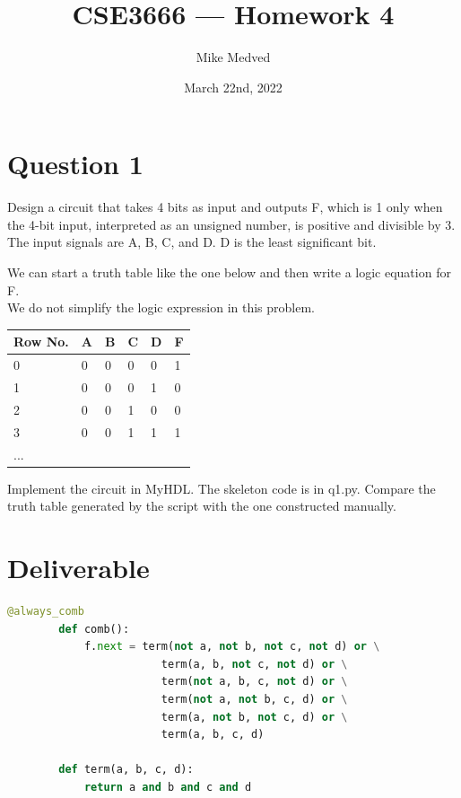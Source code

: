 \documentclass{article}
\title{CSE3666 — Homework 4}
\author{Mike Medved}
\date{March 22nd, 2022}
\begin{document}
\maketitle

\section{Question 1}
Design a circuit that takes 4 bits as input and outputs F, which is 1 only when the 4-bit input, interpreted as an unsigned number, is positive and divisible by 3. The input signals are A, B, C, and D. D is the least significant bit.

\hfill \break
We can start a truth table like the one below and then write a logic equation for F.
\\
We do not simplify the logic expression in this problem.

\hfill
\begin{table}[h]
    \centering
    \begin{tabular}{|l|l|l|l|l|l|}
    \hline
    \textbf{Row No.} & \textbf{A} & \textbf{B} & \textbf{C} & \textbf{D} & \textbf{F} \\ \hline
    0 & 0 & 0 & 0 & 0 & 1 \\ \hline
    1 & 0 & 0 & 0 & 1 & 0 \\ \hline
    2 & 0 & 0 & 1 & 0 & 0 \\ \hline
    3 & 0 & 0 & 1 & 1 & 1 \\ \hline
    ... &  &  &  &  &  \\ \hline
    \end{tabular}
\end{table}

\hfill \break
Implement the circuit in MyHDL. The skeleton code is in q1.py. Compare the truth table
generated by the script with the one constructed manually.

\break
\section{Deliverable}
    \begin{lstlisting}[language=Python,frame=tb]
        @always_comb
        def comb():
            f.next = term(not a, not b, not c, not d) or \
                        term(a, b, not c, not d) or \
                        term(not a, b, c, not d) or \
                        term(not a, not b, c, d) or \
                        term(a, not b, not c, d) or \
                        term(a, b, c, d)

        def term(a, b, c, d):
            return a and b and c and d
    \end{lstlisting}
\end{document}
